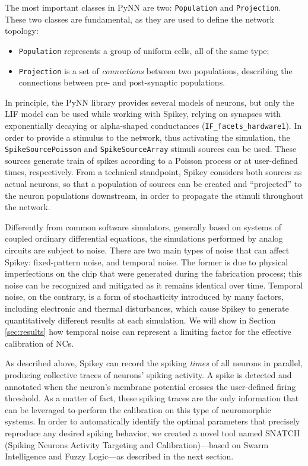 \documentclass[utf8]{frontiersFPHY} %
\newcommand {\name}{SNATCH}
\begin{document}
The most important classes in PyNN are two: \texttt{Population} and  \texttt{Projection}. 
These two classes are fundamental, as they are used to define the network topology:
\begin{itemize}
 	\item \texttt{Population} represents a group of uniform cells, all of the same type;
 	\item \texttt{Projection} is a set of \emph{connections} between two populations, describing the connections
 	between pre- and post-synaptic populations. 
 \end{itemize} 
In principle, the PyNN library provides several models of neurons, but only the LIF model can be used while working with Spikey,
relying on synapses with exponentially decaying or alpha-shaped conductances (\texttt{IF\_facets\_hardware1}). 
In order to provide a stimulus to the network, thus activating the simulation, the \texttt{SpikeSourcePoisson} and \texttt{SpikeSourceArray} stimuli sources can
be used.
These sources generate train
of spikes according to a Poisson process or at user-defined times, respectively.
From a technical standpoint, Spikey considers both sources as actual neurons, so that a population of sources can be created and ``projected'' to the  neuron populations
downstream, in order to propagate the stimuli throughout the network.

Differently from common software simulators, generally based on systems of coupled ordinary differential equations, the simulations performed by analog circuits are subject to noise.
There are two main types of noise that can affect Spikey: fixed-pattern noise, and temporal noise. 
The former is due to physical imperfections on the chip that were generated during the fabrication process; this noise can be recognized and mitigated as it remains identical over time. 
Temporal noise, on the contrary, is a form of stochasticity introduced by many factors, including electronic and thermal disturbances, which cause Spikey to generate quantitatively different results at each simulation. 
We will show in Section \ref{sec:results} how temporal noise can represent a limiting factor for the effective calibration of NCs.

As described above, Spikey can record the spiking \emph{times} of all neurons in parallel, producing collective traces of neurons' spiking activity.
A spike is detected and annotated when the neuron's membrane potential crosses the user-defined firing threshold. 
As a matter of fact, these spiking traces are the only information that can be leveraged to perform the calibration on this type of neuromorphic systems.
In order to automatically identify the optimal parameters that precisely reproduce any desired spiking behavior, we created a novel tool named \name{} (Spiking Neurons Activity Targeting and Calibration)---based on Swarm Intelligence and Fuzzy Logic---as described in the next section.
\end{document}
